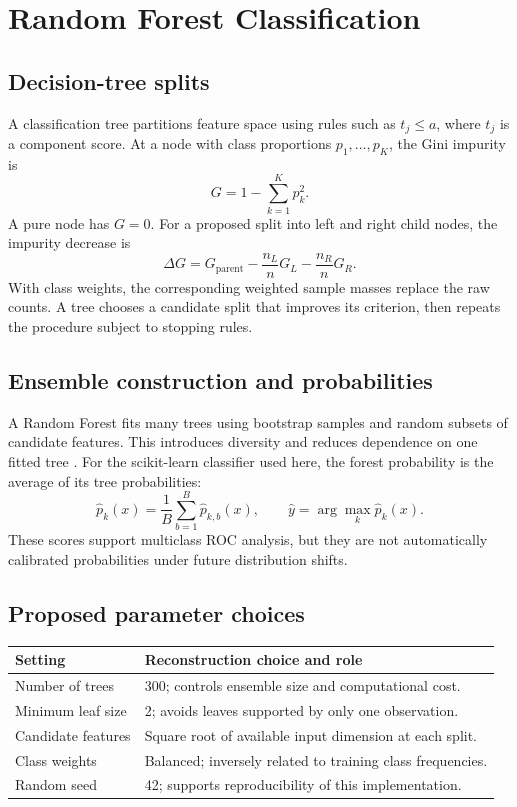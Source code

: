 \documentclass[11pt,a4paper]{article}
\newcommand{\sectionpage}[1]{\clearpage\section{#1}}
\begin{document}
\sectionpage{Random Forest Classification}
\subsection{Decision-tree splits}
A classification tree partitions feature space using rules such as $t_j\leq a$, where $t_j$ is a component score. At a node with class proportions $p_1,\ldots,p_K$, the Gini impurity is
\begin{equation}
G=1-\sum_{k=1}^Kp_k^2.
\end{equation}
A pure node has $G=0$. For a proposed split into left and right child nodes, the impurity decrease is
\begin{equation}
\Delta G=G_{\mathrm{parent}}-\frac{n_L}{n}G_L-\frac{n_R}{n}G_R.
\end{equation}
With class weights, the corresponding weighted sample masses replace the raw counts. A tree chooses a candidate split that improves its criterion, then repeats the procedure subject to stopping rules.

\subsection{Ensemble construction and probabilities}
A Random Forest fits many trees using bootstrap samples and random subsets of candidate features. This introduces diversity and reduces dependence on one fitted tree \cite{rf}. For the scikit-learn classifier used here, the forest probability is the average of its tree probabilities:
\begin{equation}
\widehat p_k(x)=\frac{1}{B}\sum_{b=1}^B\widehat p_{k,b}(x),\qquad
\widehat y=\arg\max_k\widehat p_k(x).
\end{equation}
These scores support multiclass ROC analysis, but they are not automatically calibrated probabilities under future distribution shifts.

\subsection{Proposed parameter choices}
\begin{tabularx}{\textwidth}{@{}lX@{}}\toprule
Setting & Reconstruction choice and role\\\midrule
Number of trees & 300; controls ensemble size and computational cost.\\
Minimum leaf size & 2; avoids leaves supported by only one observation.\\
Candidate features & Square root of available input dimension at each split.\\
Class weights & Balanced; inversely related to training class frequencies.\\
Random seed & 42; supports reproducibility of this implementation.\\\bottomrule
\end{tabularx}
\end{document}
